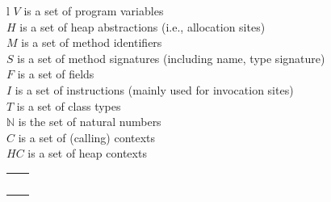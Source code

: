 \begin{figure}[tb!p]
\hspace{-1mm}
\begin{tabular}{l}
\small $V$ is a set of program variables \\
\small $H$ is a set of heap abstractions (i.e., allocation sites) \\
\small $M$ is a set of method identifiers \\
\small $S$ is a set of method signatures (including name, type signature) \\
\small $F$ is a set of fields \\
\small $I$ is a set of instructions (mainly used for invocation sites)\\
\small $T$ is a set of class types \\
\small $\mathbb{N}$ is the set of natural numbers \\
\small $C$ is a set of (calling) contexts \\
\small $HC$ is a set of heap contexts \\
\hspace{-3mm}
\begin{tabular}{l l}
\rel{Alloc}{var : V, heap : H, inMeth : M}  & \args{\# var = new ...} \\
\rel{Move}{to : V, from : V}                & \args{\# to = from} \\
\rel{Load}{to : V, base : V, fld : F}       & \args{\# to = base.fld}\\
\rel{Store}{base : V, fld : F, from : V}    & \args{\# base.fld = from} \\
\rel{VCall}{base : V, sig : S, invo : I, inMeth : M} & \args{\# base.sig(..)}   \\

\end{tabular}
\end{tabular}
\end{figure}
